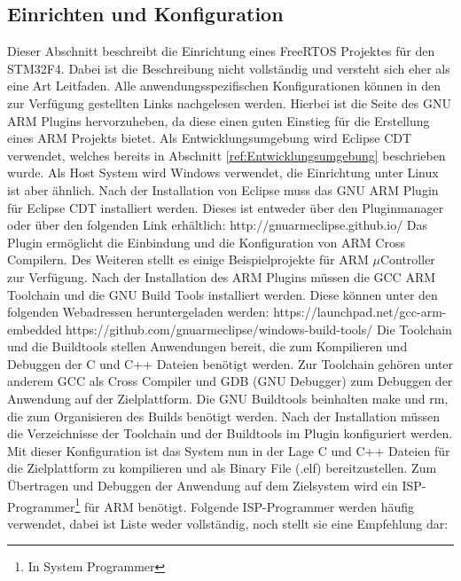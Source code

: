 \subsection{Einrichten und Konfiguration}
\label{sec:Einrichtung und Konfiguration}
Dieser Abschnitt beschreibt die Einrichtung eines FreeRTOS Projektes für den STM32F4. Dabei ist die Beschreibung nicht vollständig und versteht sich eher als eine Art Leitfaden. Alle anwendungsspezifischen Konfigurationen können in den zur Verfügung gestellten Links nachgelesen werden. Hierbei ist die Seite des GNU ARM Plugins hervorzuheben, da diese einen guten Einstieg für die Erstellung eines ARM Projekts bietet. Als Entwicklungsumgebung wird Eclipse CDT verwendet, welches bereits in Abschnitt \ref{ref:Entwicklungsumgebung} beschrieben wurde. Als Host System wird Windows verwendet, die Einrichtung unter Linux ist aber ähnlich. Nach der Installation von Eclipse muss das GNU ARM Plugin für Eclipse CDT installiert werden. Dieses ist entweder über den Pluginmanager oder über den folgenden Link erhältlich: 
\newline
\newline
http://gnuarmeclipse.github.io/
\newline
\newline
Das Plugin ermöglicht die Einbindung und die Konfiguration von ARM Cross Compilern. Des Weiteren stellt es einige Beispielprojekte für ARM $\mu$Controller zur Verfügung. Nach der Installation des ARM Plugins müssen die GCC ARM Toolchain und die GNU Build Tools installiert werden. 
Diese können unter den folgenden Webadressen heruntergeladen werden: 
\newline
\newline
https://launchpad.net/gcc-arm-embedded
\newline
https://github.com/gnuarmeclipse/windows-build-tools/
\newline
\newline
Die Toolchain und die Buildtools stellen Anwendungen bereit, die zum Kompilieren und Debuggen der C und C++ Dateien benötigt werden. Zur Toolchain gehören unter anderem GCC als Cross Compiler und GDB (GNU Debugger) zum Debuggen der Anwendung auf der Zielplattform. Die GNU Buildtools beinhalten make und rm, die zum Organisieren des Builds benötigt werden. Nach der Installation müssen die Verzeichnisse der Toolchain und der Buildtools im Plugin konfiguriert werden. Mit dieser Konfiguration ist das System nun in der Lage C und C++ Dateien für die Zielplattform zu kompilieren und als Binary File (.elf) bereitzustellen. Zum Übertragen und Debuggen der Anwendung auf dem Zielsystem wird ein ISP-Programmer\footnote{In System Programmer} für ARM benötigt. Folgende ISP-Programmer werden häu\-fig verwendet, dabei ist Liste weder vollständig, noch stellt sie eine Empfehlung dar:
